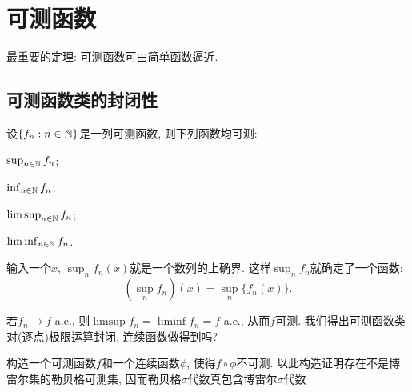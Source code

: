 \section{可测函数}
最重要的定理: 可测函数可由简单函数逼近.
\subsection{可测函数类的封闭性}
设$\{f_n: n \in \mathbb{N}\}$是一列可测函数, 则下列函数均可测:
\begin{enumerate}
{\everymath{\displaystyle}
    \item $\sup_{n \in \mathbb{N}}f_n$;
    \item $\inf_{n \in \mathbb{N}} f_n$;
    \item $\limsup_{n \in \mathbb{N}} f_n$;
    \item $\liminf_{n \in \mathbb{N}} f_n$.}
\end{enumerate}
\begin{remark}
    输入一个$x$, $\sup_n f_n(x)$就是一个数列的上确界. 
    这样$\sup_n f_n$就确定了一个函数: 
    $$\left(\sup_n f_n\right)(x) = \sup_n \{f_n(x)\}.$$
\end{remark}
若$f_n \to f$ a.e., 则$\limsup f_n = \liminf f_n = f$ a.e., 从而$f$可测. 我们得出可测函数类对(逐点)极限运算封闭, 连续函数做得到吗? 

\begin{exercise}
    构造一个可测函数$f$和一个连续函数$\phi$, 使得$f \circ \phi$不可测.
    以此构造证明存在不是博雷尔集的勒贝格可测集, 因而勒贝格$\sigma$代数真包含博雷尔$\sigma$代数
\end{exercise}



